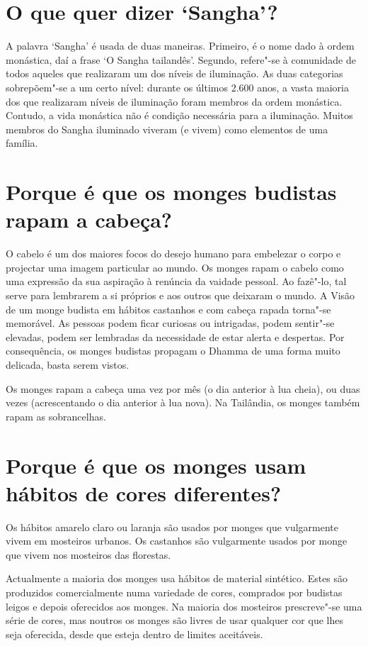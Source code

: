 \section{O que quer dizer `Sangha'?}

A palavra `Sangha' é usada de duas maneiras. Primeiro, é o nome dado à
ordem monástica, daí a frase `O Sangha tailandês'. Segundo, refere"-se à
comunidade de todos aqueles que realizaram um dos níveis de iluminação.
As duas categorias sobrepõem"-se a um certo nível: durante os últimos
2.600 anos, a vasta maioria dos que realizaram níveis de iluminação
foram membros da ordem monástica. Contudo, a vida monástica não é
condição necessária para a iluminação. Muitos membros do Sangha
iluminado viveram (e vivem) como elementos de uma família.

\section{Porque é que os monges budistas rapam a cabeça?}

O cabelo é um dos maiores focos do desejo humano para embelezar o corpo
e projectar uma imagem particular ao mundo. Os monges rapam o cabelo
como uma expressão da sua aspiração à renúncia da vaidade pessoal. Ao
fazê"-lo, tal serve para lembrarem a si próprios e aos outros que
deixaram o mundo. A Visão de um monge budista em hábitos castanhos e com
cabeça rapada torna"-se memorável. As pessoas podem ficar curiosas ou
intrigadas, podem sentir"-se elevadas, podem ser lembradas da necessidade
de estar alerta e despertas. Por consequência, os monges budistas
propagam o Dhamma de uma forma muito delicada, basta serem vistos.

Os monges rapam a cabeça uma vez por mês (o dia anterior à lua cheia),
ou duas vezes (acrescentando o dia anterior à lua nova). Na Tailândia,
os monges também rapam as sobrancelhas.

\section{Porque é que os monges usam hábitos de cores diferentes?}

Os hábitos amarelo claro ou laranja são usados por monges que
vulgarmente vivem em mosteiros urbanos. Os castanhos são vulgarmente
usados por monge que vivem nos mosteiros das florestas.

Actualmente a maioria dos monges usa hábitos de material sintético.
Estes são produzidos comercialmente numa variedade de cores, comprados
por budistas leigos e depois oferecidos aos monges. Na maioria dos
mosteiros prescreve"-se uma série de cores, mas noutros os monges são
livres de usar qualquer cor que lhes seja oferecida, desde que esteja
dentro de limites aceitáveis.

